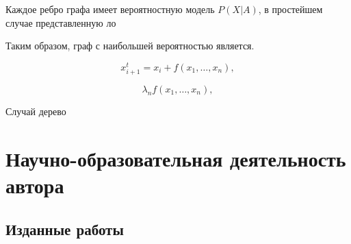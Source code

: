 Каждое ребро графа имеет вероятностную модель $P(X|A)$, в простейшем случае представленную ло

Таким образом, граф с наибольшей вероятностью является. 

\begin{equation}
    x^t_{i+1} = x_i + f(x_1, \dots, x_n), 
\end{equation}

$$
    \lambda_n  f(x_1, \dots, x_n), 
$$


 Случай дерево

\section{Научно-образовательная деятельность автора}

\subsection{Изданные работы}



